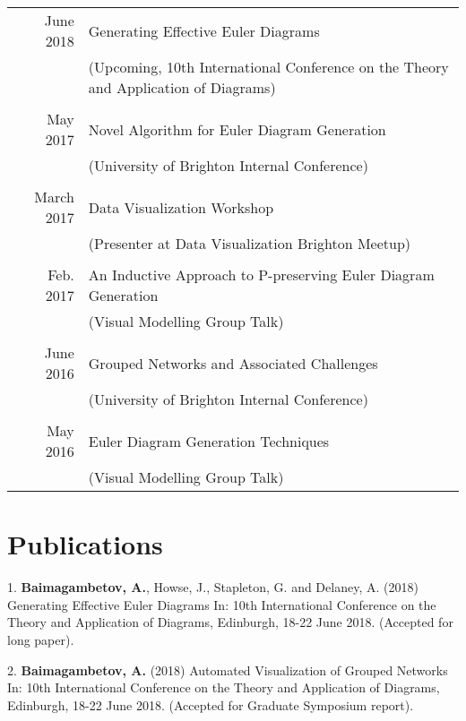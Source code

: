 \documentclass[a4paper,11pt]{article} %
\begin{document}
\begin{center}
\begin{tabular}{rl}
June 2018 & Generating Effective Euler Diagrams\\ & (Upcoming, 10th International Conference on the Theory and Application of Diagrams) \\
\\
May 2017 & Novel Algorithm for Euler Diagram Generation\\ & (University of Brighton Internal Conference) \\
\\
March 2017 & Data Visualization Workshop\\ & (Presenter at Data Visualization Brighton Meetup) \\
\\
Feb. 2017 & An Inductive Approach to P-preserving Euler Diagram Generation\\ & (Visual Modelling Group Talk) \\
\\
June 2016 & Grouped Networks and Associated Challenges\\ & (University of Brighton Internal Conference) \\
\\
May 2016 & Euler Diagram Generation Techniques\\ & (Visual Modelling Group Talk) \\
\end{tabular}
\end{center}



\section{Publications}

1. \textbf{Baimagambetov, A.}, Howse, J., Stapleton, G. and Delaney, A. (2018)
Generating Effective Euler Diagrams In:
10th International Conference on the Theory and Application of Diagrams, Edinburgh, 18-22 June 2018.
(Accepted for long paper).

2. \textbf{Baimagambetov, A.} (2018)
Automated Visualization of Grouped Networks In:
10th International Conference on the Theory and Application of Diagrams, Edinburgh, 18-22 June 2018.
(Accepted for Graduate Symposium report).
\end{document}
